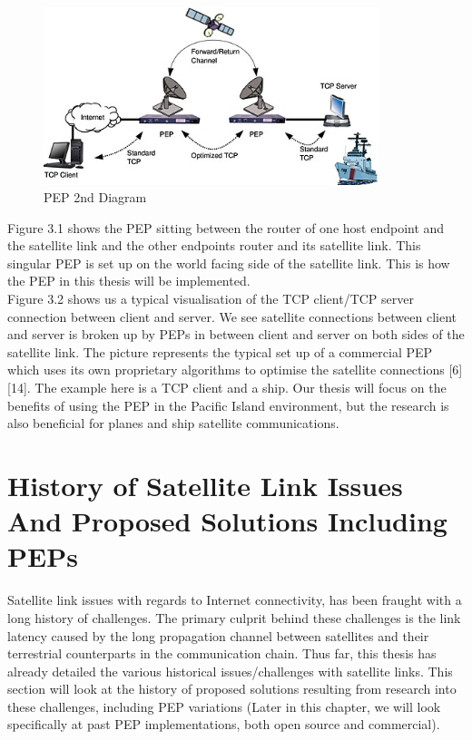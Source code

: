 \documentclass{uathesis}
\begin{document}
\begin{figure}[h!]
    \centering
    \includegraphics[width=0.87\textwidth]{PEP2.PNG}
    \caption{PEP 2nd Diagram}
    \label{fig:PEP2}
\end{figure}

Figure 3.1 shows the PEP sitting between the router of one host endpoint and the satellite link and the other endpoints router and its satellite link. This singular PEP is set up on the world facing side of the satellite link. This is how the PEP in this thesis will be implemented.  \\

Figure 3.2 shows us a typical visualisation of the TCP client/TCP server connection between client and server. We see satellite connections between client and server is broken up by PEPs in between client and server on both sides of the satellite link. The picture represents the typical set up of a commercial PEP which uses its own proprietary algorithms to optimise the satellite connections [6][14]. The example here is a TCP client and a ship. Our thesis will focus on the benefits of using the PEP in the Pacific Island environment, but the research is also beneficial for planes and ship satellite communications. \\

\section{History of Satellite Link Issues And Proposed Solutions Including PEPs}
Satellite link issues with regards to Internet connectivity, has been fraught with a long history of challenges. The primary culprit behind these challenges is the link latency caused by the long propagation channel between satellites and their terrestrial counterparts in the communication chain. Thus far, this thesis has already detailed the various historical issues/challenges with satellite links. This section will look at the history of proposed solutions resulting from research into these challenges, including PEP variations (Later in this chapter, we will look specifically at past PEP implementations, both open source and commercial). \\
\end{document}
